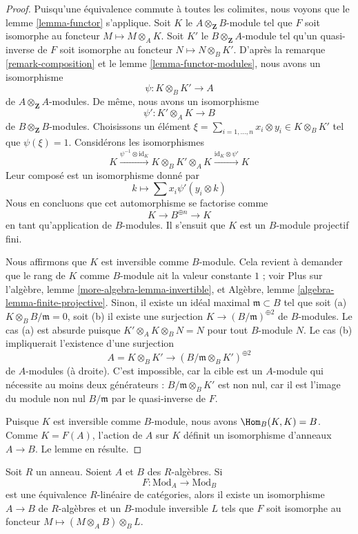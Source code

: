 \begin{proof}
Puisqu'une équivalence commute à toutes les colimites, nous voyons que le
lemme \ref{lemma-functor} s'applique. Soit $K$ le
$A \otimes_\mathbf{Z} B$-module tel que $F$ soit
isomorphe au foncteur $M \mapsto M \otimes_A K$.
Soit $K'$ le $B \otimes_\mathbf{Z} A$-module tel qu'un
quasi-inverse de $F$ soit
isomorphe au foncteur $N \mapsto N \otimes_B K'$.
D'après la remarque \ref{remark-composition} et le
lemme \ref{lemma-functor-modules}, nous avons un isomorphisme
$$
\psi : K \otimes_B K' \longrightarrow A
$$
de $A \otimes_\mathbf{Z} A$-modules.
De même, nous avons un isomorphisme
$$
\psi' : K' \otimes_A K \longrightarrow B
$$
de $B \otimes_\mathbf{Z} B$-modules. Choisissons un élément
$\xi = \sum_{i = 1, \ldots, n} x_i \otimes y_i \in K \otimes_B K'$
tel que $\psi(\xi) = 1$. Considérons les isomorphismes
$$
K \xrightarrow{\psi^{-1} \otimes \text{id}_K}
K \otimes_B K' \otimes_A K \xrightarrow{\text{id}_K \otimes \psi'} K
$$
Leur composé est un isomorphisme donné par
$$
k \longmapsto \sum x_i \psi'(y_i \otimes k)
$$
Nous en concluons que cet automorphisme se factorise comme
$$
K \to B^{\oplus n} \to K
$$
en tant qu'application de $B$-modules. Il s'ensuit que $K$ est un
$B$-module projectif fini.

\medskip\noindent
Nous affirmons que $K$ est inversible comme $B$-module. Cela revient
à demander que le rang de $K$ comme $B$-module ait la valeur constante $1$ ;
voir Plus sur l'algèbre, lemme \ref{more-algebra-lemma-invertible}, et
Algèbre, lemme \ref{algebra-lemma-finite-projective}.
Sinon, il existe un idéal maximal $\mathfrak m \subset B$
tel que soit (a) $K \otimes_B B/\mathfrak m = 0$, soit
(b) il existe une surjection $K \to (B/\mathfrak m)^{\oplus 2}$ de
$B$-modules. Le cas (a) est absurde puisque $K' \otimes_A K \otimes_B N = N$
pour tout $B$-module $N$. Le cas (b) impliquerait l'existence d'une surjection
$$
A = K \otimes_B K' \longrightarrow (B/\mathfrak m \otimes_B K')^{\oplus 2}
$$
de $A$-modules (à droite). C'est impossible, car la cible est un $A$-module
qui nécessite au moins deux générateurs : $B/\mathfrak m \otimes_B K'$
est non nul, car il est l'image du module non nul $B/\mathfrak m$ par
le quasi-inverse de $F$.

\medskip\noindent
Puisque $K$ est inversible comme $B$-module, nous avons $\Hom_B(K, K) = B$.
Comme $K = F(A)$, l'action de $A$ sur $K$ définit un isomorphisme d'anneaux
$A \to B$. Le lemme en résulte.
\end{proof}

\begin{lemma}
\label{lemma-functor-equivalence-linear}
Soit $R$ un anneau. Soient $A$ et $B$ des $R$-algèbres. Si
$$
F : \text{Mod}_A \longrightarrow \text{Mod}_B
$$
est une équivalence $R$-linéaire de catégories, alors il existe
un isomorphisme $A \to B$ de $R$-algèbres et un $B$-module inversible $L$ tels que
$F$ soit isomorphe au foncteur $M \mapsto (M \otimes_A B) \otimes_B L$.
\end{lemma}

